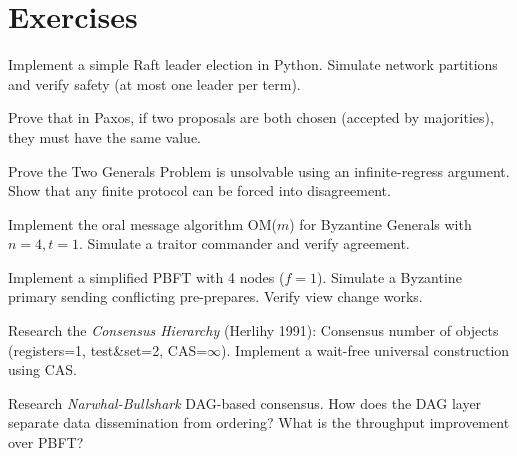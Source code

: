 \section{Exercises}
\label{sec:consensus:exercises}

\begin{exercise}[Basic]
Implement a simple Raft leader election in Python. Simulate network partitions and verify safety (at most one leader per term).
\end{exercise}

\begin{exercise}[Basic]
Prove that in Paxos, if two proposals are both chosen (accepted by majorities), they must have the same value.
\end{exercise}

\begin{exercise}[Basic]
Prove the Two Generals Problem is unsolvable using an infinite-regress argument. Show that any finite protocol can be forced into disagreement.
\end{exercise}

\begin{exercise}[Basic]
Implement the oral message algorithm OM($m$) for Byzantine Generals with $n = 4, t = 1$. Simulate a traitor commander and verify agreement.
\end{exercise}

\begin{exercise}[Intermediate]
Implement a simplified PBFT with 4 nodes ($f=1$). Simulate a Byzantine primary sending conflicting pre-prepares. Verify view change works.
\end{exercise}

\begin{exercise}[Intermediate]
Research the \emph{Consensus Hierarchy} (Herlihy 1991): Consensus number of objects (registers=1, test\&set=2, CAS=$\infty$). Implement a wait-free universal construction using CAS.
\end{exercise}

\begin{exercise}[Intermediate]
Research \emph{Narwhal-Bullshark} DAG-based consensus. How does the DAG layer separate data dissemination from ordering? What is the throughput improvement over PBFT?
\end{exercise}

